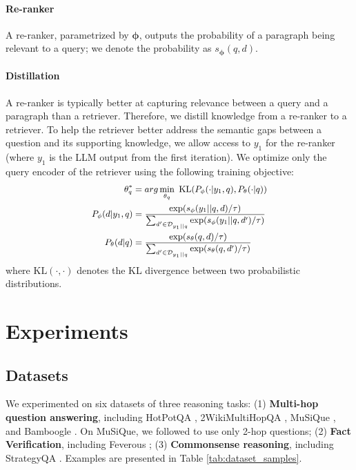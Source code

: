 \documentclass[11pt]{article}
\begin{document}
\paragraph{Re-ranker}
A re-ranker, parametrized by $\mathbf{\phi}$, outputs the probability of a paragraph being relevant to a query; we denote the probability as $s_\mathbf{\phi}(q, d)$.

\paragraph{Distillation}
A re-ranker is typically better at capturing relevance between a query and a paragraph than a retriever.
Therefore, we distill knowledge from a re-ranker to a retriever.
To help the retriever better address the semantic gaps between a question and its supporting knowledge, we allow access to $y_1$ for the re-ranker (where $y_1$ is the LLM output from the first iteration).
We optimize only the query encoder of the retriever using the following training objective:
\begin{equation}
    \small
    \begin{split}
        \mathbf{\theta}_q^* &= arg \min_{\mathbf{\theta}_q}\ \text{KL}(P_\mathbf{\phi}(\cdot | y_1, q), P_\mathbf{\theta}(\cdot | q)) \\
        P_\mathbf{\phi}(d|y_1, q) &= \frac{\exp (s_\mathbf{\phi}(y_1 || q, d) / \tau)}{\sum_{d^\prime \in \mathcal{D}_{y_1 || q}} \exp(s_\mathbf{\phi}(y_1 || q, d^\prime) / \tau)} \\
        P_\mathbf{\theta}(d|q) &= \frac{\exp(s_\mathbf{\theta}(q, d) / \tau)}{\sum_{d^\prime \in \mathcal{D}_{y_1 || q}} \exp(s_\mathbf{\theta}(q, d^\prime) / \tau)} \\
    \end{split} \label{eq:obj}
\end{equation}
where $\text{KL}(\cdot, \cdot)$ denotes the KL divergence between two probabilistic distributions.

\section{Experiments}

\subsection{Datasets}

We experimented on six datasets of three reasoning tasks:
(1) \textbf{Multi-hop question answering}, including HotPotQA \cite{DBLP:conf/emnlp/Yang0ZBCSM18}, 2WikiMultiHopQA \cite{DBLP:conf/coling/HoNSA20}, MuSiQue \cite{DBLP:journals/tacl/TrivediBKS22}, and Bamboogle \cite{DBLP:journals/corr/abs-2210-03350}.
On MuSiQue, we followed \citet{DBLP:journals/corr/abs-2210-03350} to use only 2-hop questions;
(2) \textbf{Fact Verification}, including Feverous \cite{DBLP:conf/nips/AlyGST00CM21};
(3) \textbf{Commonsense reasoning}, including StrategyQA \cite{DBLP:journals/tacl/GevaKSKRB21}.
Examples are presented in Table \ref{tab:dataset_samples}.
\end{document}
